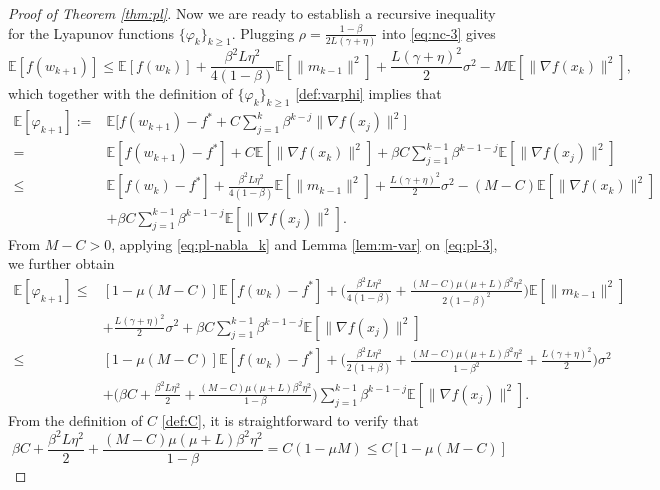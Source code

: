 \documentclass[10pt,a4paper]{amsart}
\newcommand{\ebb}{\mathbb{E}}  %
\begin{document}
\begin{proof}[Proof of Theorem \ref{thm:pl}]
Now we are ready to establish a recursive inequality for the Lyapunov functions $\{\varphi_k\}_{k\ge 1}$. Plugging $\rho=\frac{1-\beta}{2 L(\gamma+\eta)}$ into \eqref{eq:nc-3} gives
\[
\ebb[f(w_{k+1})] \leq \ebb[f(w_k)]+\frac{\beta^2 L \eta^2}{4(1-\beta)} \ebb[\|m_{k-1}\|^2]+\frac{L(\gamma+\eta)^2}{2} \sigma^2-M \ebb[\|\nabla f(x_k)\|^2],
\]
which together with the definition of $\{\varphi_k\}_{k\ge 1}$ \eqref{def:varphi} implies that
\begin{equation}\label{eq:pl-3}
\begin{aligned}
\ebb[\varphi_{k+1}]:=&\ebb\Big[f(w_{k+1})-f^*+C \sum_{j=1}^k \beta^{k-j}\|\nabla f(x_j)\|^2\Big]\\
=&\ebb[f(w_{k+1})-f^*]+C \ebb[\|\nabla f(x_k)\|^2]+\beta C \sum_{j=1}^{k-1} \beta^{k-1-j} \ebb[\|\nabla f(x_j)\|^2] \\
\leq & \ebb[f(w_k)-f^*]+\frac{\beta^2 L \eta^2}{4(1-\beta)} \ebb[\|m_{k-1}\|^2]+\frac{L(\gamma+\eta)^2}{2} \sigma^2-(M-C) \ebb[\|\nabla f(x_k)\|^2]\\
&+\beta C \sum_{j=1}^{k-1} \beta^{k-1-j} \ebb[\|\nabla f(x_j)\|^2].
\end{aligned}
\end{equation}
From $M-C>0$, applying \eqref{eq:pl-nabla_k} and Lemma \ref{lem:m-var} on \eqref{eq:pl-3}, we further obtain
\begin{equation}\label{eq:pl-4}
\begin{aligned}
\ebb[\varphi_{k+1}] \leq& [1-\mu(M-C)] \ebb[f(w_k)-f^*]+\Big(\frac{\beta^2 L \eta^2}{4(1-\beta)}+\frac{(M-C) \mu(\mu+L) \beta^2 \eta^2}{2(1-\beta)^2}\Big) \ebb[\|m_{k-1}\|^2] \\
&+\frac{L(\gamma+\eta)^2}{2} \sigma^2+\beta C \sum_{j=1}^{k-1} \beta^{k-1-j} \ebb[\|\nabla f(x_j)\|^2]\\
\leq & [1-\mu(M-C)] \ebb[f(w_k)-f^*]+\Big(\frac{\beta^2 L \eta^2}{2(1+\beta)}+\frac{(M-C) \mu(\mu+L) \beta^2 \eta^2}{1-\beta^2}+\frac{L(\gamma+ \eta)^2}{2}\Big) \sigma^2 \\
& +\Big(\beta C+\frac{\beta^2 L \eta^2}{2}+\frac{(M-C) \mu(\mu+L) \beta^2 \eta^2}{1-\beta}\Big) \sum_{j=1}^{k-1} \beta^{k-1-j} \ebb[\|\nabla f(x_j)\|^2].
\end{aligned}
\end{equation}
From the definition of $C$ \eqref{def:C}, it is straightforward to verify that
\begin{equation}\label{eq:pl-5}
\beta C+\frac{\beta^2 L \eta^2}{2}+\frac{(M-C) \mu(\mu+L) \beta^2 \eta^2}{1-\beta} = C(1-\mu M)\leq C[1-\mu(M-C)]
\end{equation}

\end{proof}
\end{document}
